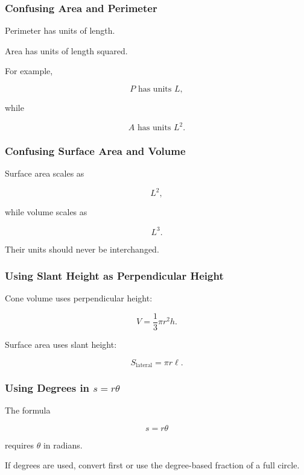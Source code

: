 \subsubsection{Confusing Area and Perimeter}

Perimeter has units of length.

Area has units of length squared.

For example,

\[
\boxed{
P
\text{ has units }L,
}
\]

while

\[
\boxed{
A
\text{ has units }L^2.
}
\]

\subsubsection{Confusing Surface Area and Volume}

Surface area scales as

\[
\boxed{
L^2,
}
\]

while volume scales as

\[
\boxed{
L^3.
}
\]

Their units should never be interchanged.

\subsubsection{Using Slant Height as Perpendicular Height}

Cone volume uses perpendicular height:

\[
\boxed{
V
=
\frac13\pi r^2h.
}
\]

Surface area uses slant height:

\[
\boxed{
S_{\mathrm{lateral}}
=
\pi r\ell.
}
\]

\subsubsection{Using Degrees in \(s=r\theta\)}

The formula

\[
\boxed{
s=r\theta
}
\]

requires \(\theta\) in radians.

If degrees are used, convert first or use the degree-based fraction of a full
circle.

